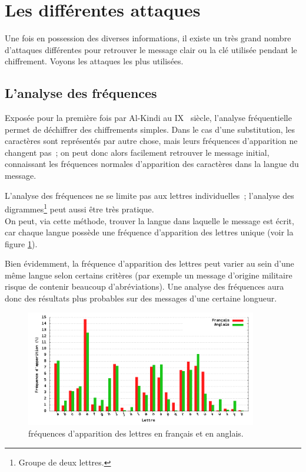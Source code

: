 \section{Les différentes attaques}
Une fois en possession des diverses informations, il existe un
très grand nombre d'attaques différentes pour retrouver le message
clair ou la clé utilisée pendant le chiffrement. Voyons les
attaques les plus utilisées.

\subsection{L'analyse des fréquences\label{sec:AnalyseFrequences}}
Exposée pour la première fois par Al-Kindi au IX\ieme~ siècle,
l'analyse fréquentielle permet de déchiffrer des chiffrements
simples. Dans le cas d'une substitution, les
caractères sont représentés par autre chose, mais leurs fréquences
d'apparition ne changent pas~; on peut donc alors facilement
retrouver le message initial, connaissant les fréquences
normales d'apparition des caractères dans la langue du message.

L'analyse des fréquences ne se limite pas aux lettres
individuelles~; l'analyse des digrammes\footnote{Groupe de deux
lettres.} peut aussi être très
pratique.
\\

On peut, via cette méthode, trouver la langue dans laquelle le
message est écrit, car chaque langue possède une fréquence
d'apparition des lettres unique (voir la figure \ref{fig:Frequences}).

Bien évidemment, la fréquence d'apparition des lettres peut varier
au sein d'une même langue selon certains critères (par exemple un
message d'origine militaire risque de contenir beaucoup
d'abréviations). Une analyse des fréquences aura donc des résultats
plus probables sur des messages d'une certaine longueur.

\begin{figure}[h]
  \centering
    \includegraphics[width=0.9\textwidth]{plot/Frequences.png}
    \caption{fréquences d'apparition des lettres en français et en
anglais.}
  \label{fig:Frequences}
\end{figure}

